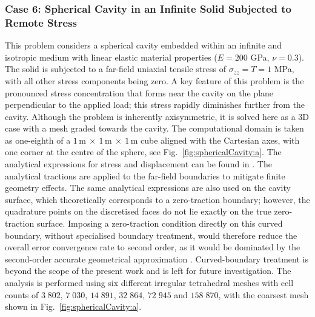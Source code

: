 \documentclass[sn-mathphys,Numbered]{sn-jnl}%
\begin{document}
\subsubsection{Case 6: Spherical Cavity in an Infinite Solid Subjected to Remote Stress}
\label{case:sphericalCavity}
%
This problem considers a spherical cavity embedded within an infinite and isotropic medium with linear elastic material properties ($E = 200$ GPa, $\nu = 0.3$).
The solid is subjected to a far-field uniaxial tensile stress of $\sigma_{zz} = T = 1$ MPa, with all other stress components being zero.
A key feature of this problem is the pronounced stress concentration that forms near the cavity on the plane perpendicular to the applied load; 
this stress rapidly diminishes further from the cavity. 
Although the problem is inherently axisymmetric, it is solved here as a 3D case with a mesh graded towards the cavity.
The computational domain is taken as one-eighth of a $1\,\text{m}~\times~1\,\text{m}~\times~1\,\text{m}$ cube aligned with the Cartesian axes, with one corner at the centre of the sphere, see Fig.~\ref{fig:sphericalCavity:a}.
The analytical expressions for stress \cite{Southwell1926} and displacement \cite{Goodier1933} can be found in \cite{Cardiff2025}.
The analytical tractions are applied to the far-field boundaries to mitigate finite geometry effects. 
The same analytical expressions are also used on the cavity surface, which theoretically corresponds to a zero-traction boundary; however, the quadrature points on the discretised faces do not lie exactly on the true zero-traction surface. Imposing a zero-traction condition directly on this curved boundary, without specialised boundary treatment, would therefore reduce the overall error convergence rate to second order, as it would be dominated by the second-order accurate geometrical approximation \cite{costa2021, Gooch2002}.  
Curved-boundary treatment is beyond the scope of the present work and is left for future investigation.
The analysis is performed using six different irregular tetrahedral meshes with cell counts of $3\;802$, $7\;030$, $14\;891$, $32\;864$, $72\;945$ and $158\;870$, with the coarsest mesh shown in Fig.~\ref{fig:sphericalCavity:a}.
\end{document}
